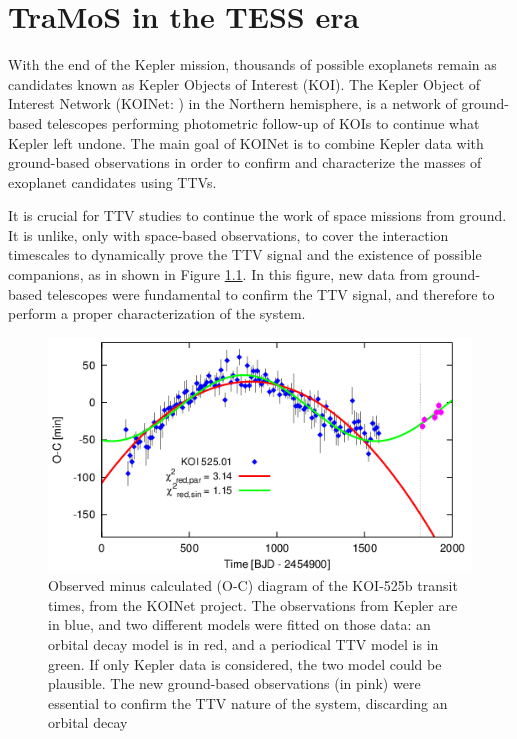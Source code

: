\chapter{TraMoS in the TESS era}\label{chap:tess}

With the end of the Kepler mission, thousands of possible exoplanets remain as candidates known as Kepler Objects of Interest (KOI). The Kepler Object of Interest Network (KOINet: \citep{vonEssen2018,Freuddenthal2018}) in the Northern hemisphere, is a network of ground-based telescopes performing photometric follow-up of KOIs to continue what Kepler left undone. The main goal of KOINet is to combine Kepler data with ground-based observations in order to confirm and characterize the masses of exoplanet candidates using TTVs.

It is crucial for TTV studies to continue the work of space missions from ground. It is unlike, only with space-based observations, to cover the interaction timescales to dynamically prove the TTV signal and the existence of possible companions, as in shown in Figure \ref{koinet}. In this figure, new data from ground-based telescopes were fundamental to confirm the TTV signal, and therefore to perform a proper characterization of the system.

\begin{figure}
\centering
\includegraphics[width=0.8\columnwidth]{imagenes/koinet.png}
\caption{Observed minus calculated (O-C) diagram of the KOI-525b transit times, from the KOINet project. The observations from Kepler are in blue, and two different models were fitted on those data: an orbital decay model is in red, and a periodical TTV model is in green. If only Kepler data is considered, the two model could be plausible. The new ground-based observations (in pink) were essential to confirm the TTV nature of the system, discarding an orbital decay}
\label{koinet}
\end{figure}

